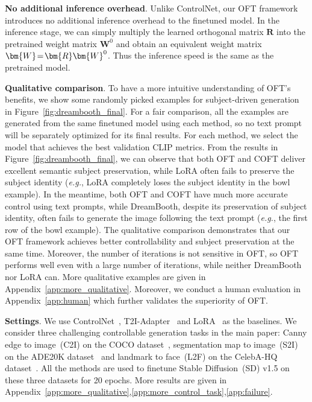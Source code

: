 \textbf{No additional inference overhead}. Unlike ControlNet, our OFT framework introduces no additional inference overhead to the finetuned model. In the inference stage, we can simply multiply the learned orthogonal matrix $\bm{R}$ into the pretrained weight matrix $\bm{W}^0$ and obtain an equivalent weight matrix $\thickmuskip=2mu \medmuskip=2mu \bm{W}=\bm{R}\bm{W}^0$. Thus the inference speed is the same as the pretrained model.

\textbf{Qualitative comparison}. To have a more intuitive understanding of OFT's benefits, we show some randomly picked examples for subject-driven generation in Figure~\ref{fig:dreambooth_final}. For a fair comparison, all the examples are generated from the same finetuned model using each method, so no text prompt will be separately optimized for its final results. For each method, we select the model that achieves the best validation CLIP metrics. From the results in Figure~\ref{fig:dreambooth_final}, we can observe that both OFT and COFT deliver excellent semantic subject preservation, while LoRA often fails to preserve the subject identity (\emph{e.g.}, LoRA completely loses the subject identity in the bowl example). In the meantime, both OFT and COFT have much more accurate control using text prompts, while DreamBooth, despite its preservation of subject identity, often fails to generate the image following the text prompt (\emph{e.g.}, the first row of the bowl example). The qualitative comparison demonstrates that our OFT framework achieves better controllability and subject preservation at the same time. Moreover, the number of iterations is not sensitive in OFT, so OFT performs well even with a large number of iterations, while neither DreamBooth nor LoRA can. More qualitative examples are given in Appendix~\ref{app:more_qualitative}. Moreover, we conduct a human evaluation in Appendix~\ref{app:human} which further validates the superiority of OFT.

\textbf{Settings}. We use ControlNet~\cite{zhang2023adding}, T2I-Adapter~\cite{mou2023t2i} and LoRA~\cite{hulora2022} as the baselines. We consider three challenging controllable generation tasks in the main paper: Canny edge to image~(C2I) on the COCO dataset~\cite{lin2014microsoft}, segmentation map to image~(S2I) on the ADE20K dataset~\cite{zhou2017scene} and landmark to face~(L2F) on the CelebA-HQ dataset~\cite{karras2018progressive,xia2021tedigan}. All the methods are used to finetune Stable Diffusion~(SD) v1.5 on these three datasets for 20 epochs. More results are given in Appendix~\ref{app:more_qualitative},\ref{app:more_control_task},\ref{app:failure}.